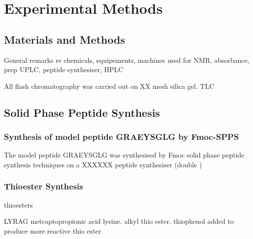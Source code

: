 \chapter{Experimental Methods}
\ifpdf
    \graphicspath{{Experimental/ExperimentalFigs/PNG/}{Experimental/ExperimentalFigs/PDF/}{Experimental/ExperimentalFigs/}}
\else
    \graphicspath{{Experimental/ExperimentalFigs/EPS/}{Experimental/ExperimentalFigs/}}
\fi


\section{Materials and Methods}

General remarks re chemicals, equipements, machines used for NMR, absorbance, prep UPLC, peptide synthesiser, HPLC

All flash chromatography was carried out on XX mesh silica gel. TLC


\section{Solid Phase Peptide Synthesis}


\subsection{Synthesis of model peptide GRAEYSGLG by Fmoc-SPPS}

The model peptide GRAEYSGLG was synthesised by Fmoc solid phase peptide synthesis techniques on a XXXXXX peptide synthesiser (double )


\subsection{Thioester Synthesis}

thioesters

LYRAG metcaptopropionic acid lysine.
alkyl thio ester.
thiophenol added to produce more reactive thio ester



